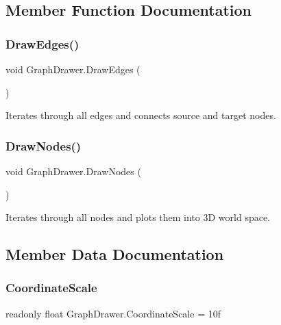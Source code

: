 \subsection{Member Function Documentation}
\mbox{\label{class_graph_drawer_ad4bde4b9d817629c77bc1e8818e5cd69}} 
\subsubsection{\texorpdfstring{DrawEdges()}{DrawEdges()}}
{\footnotesize\ttfamily void Graph\+Drawer.\+Draw\+Edges (\begin{DoxyParamCaption}{ }\end{DoxyParamCaption})\hspace{0.3cm}{\ttfamily [inline]}}



Iterates through all edges and connects source and target nodes. 

\mbox{\label{class_graph_drawer_a3aabb356d594c77af566191bc7869eff}} 
\subsubsection{\texorpdfstring{DrawNodes()}{DrawNodes()}}
{\footnotesize\ttfamily void Graph\+Drawer.\+Draw\+Nodes (\begin{DoxyParamCaption}{ }\end{DoxyParamCaption})\hspace{0.3cm}{\ttfamily [inline]}}



Iterates through all nodes and plots them into 3D world space. 



\subsection{Member Data Documentation}
\mbox{\label{class_graph_drawer_a8e26c2305c588cd202dce84292b7cd14}} 
\subsubsection{\texorpdfstring{CoordinateScale}{CoordinateScale}}
{\footnotesize\ttfamily readonly float Graph\+Drawer.\+Coordinate\+Scale = 10f\hspace{0.3cm}{\ttfamily [static]}}



